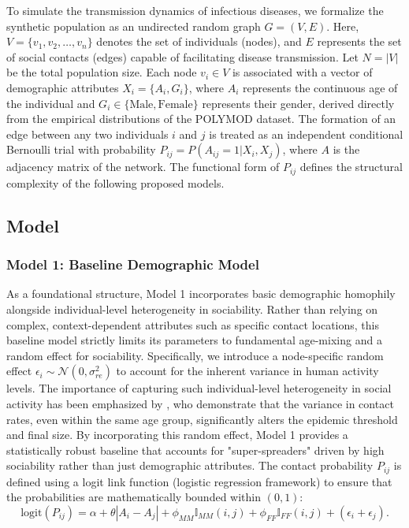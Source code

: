 To simulate the transmission dynamics of infectious diseases, we formalize the synthetic population as an undirected random graph $G = (V, E)$. Here, $V = \{v_1, v_2, \dots, v_n\}$ denotes the set of individuals (nodes), and $E$ represents the set of social contacts (edges) capable of facilitating disease transmission.
Let $N = |V|$ be the total population size.
Each node $v_i \in V$ is associated with a vector of demographic attributes $X_i = \{A_i, G_i\}$, where $A_i$ represents the continuous age of the individual and $G_i \in \{\text{Male}, \text{Female}\}$ represents their gender, derived directly from the empirical distributions of the POLYMOD dataset.
The formation of an edge between any two individuals $i$ and $j$ is treated as an independent conditional Bernoulli trial with probability $P_{ij} = P(A_{ij}=1 | X_i, X_j)$, where $A$ is the adjacency matrix of the network.
The functional form of $P_{ij}$ defines the structural complexity of the following proposed models.

\subsection{Model}

\subsubsection{Model 1: Baseline Demographic Model}
As a foundational structure, Model 1 incorporates basic demographic homophily alongside individual-level heterogeneity in sociability.
Rather than relying on complex, context-dependent attributes such as specific contact locations, this baseline model strictly limits its parameters to fundamental age-mixing and a random effect for sociability.
Specifically, we introduce a node-specific random effect $\epsilon_i \sim \mathcal{N}(0, \sigma_{re}^2)$ to account for the inherent variance in human activity levels.
The importance of capturing such individual-level heterogeneity in social activity has been emphasized by \textcite{britton2025improving}, who demonstrate that the variance in contact rates, even within the same age group, significantly alters the epidemic threshold and final size.
By incorporating this random effect, Model 1 provides a statistically robust baseline that accounts for "super-spreaders" driven by high sociability rather than just demographic attributes.
The contact probability $P_{ij}$ is defined using a logit link function (logistic regression framework) to ensure that the probabilities are mathematically bounded within $(0, 1)$:
\begin{equation} \label{eq:m1_logit}
    \text{logit}(P_{ij}) = \alpha + \theta |A_i - A_j| + \phi_{MM} \mathbb{I}_{MM}(i, j) + \phi_{FF} \mathbb{I}_{FF}(i, j) + (\epsilon_i + \epsilon_j).
\end{equation}

